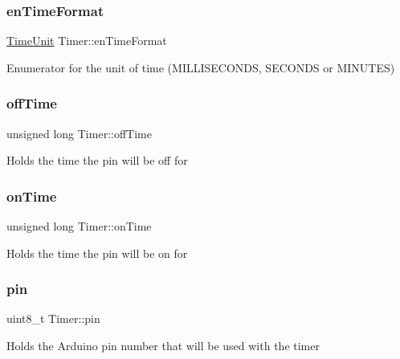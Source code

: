 \subsubsection{\texorpdfstring{en\+Time\+Format}{enTimeFormat}}
{\footnotesize\ttfamily \hyperlink{_timer_8h_add9fe45e09605eee3e4a39c8a5c4476d}{Time\+Unit} Timer\+::en\+Time\+Format\hspace{0.3cm}{\ttfamily [protected]}}

Enumerator for the unit of time (M\+I\+L\+L\+I\+S\+E\+C\+O\+N\+DS, S\+E\+C\+O\+N\+DS or M\+I\+N\+U\+T\+ES) \hypertarget{class_timer_a884fa0db2b95029da69e11fbb53612b2}{}\label{class_timer_a884fa0db2b95029da69e11fbb53612b2} 
\subsubsection{\texorpdfstring{off\+Time}{offTime}}
{\footnotesize\ttfamily unsigned long Timer\+::off\+Time\hspace{0.3cm}{\ttfamily [protected]}}

Holds the time the pin will be off for \hypertarget{class_timer_afa967387e3e6c7506334fcd886ea152a}{}\label{class_timer_afa967387e3e6c7506334fcd886ea152a} 
\subsubsection{\texorpdfstring{on\+Time}{onTime}}
{\footnotesize\ttfamily unsigned long Timer\+::on\+Time\hspace{0.3cm}{\ttfamily [protected]}}

Holds the time the pin will be on for \hypertarget{class_timer_a1452d92813046e6badb287f30789580e}{}\label{class_timer_a1452d92813046e6badb287f30789580e} 
\subsubsection{\texorpdfstring{pin}{pin}}
{\footnotesize\ttfamily uint8\+\_\+t Timer\+::pin\hspace{0.3cm}{\ttfamily [protected]}}

Holds the Arduino pin number that will be used with the timer \hypertarget{class_timer_a436bf19bc3bd3dc1c07751adbc1dbe42}{}\label{class_timer_a436bf19bc3bd3dc1c07751adbc1dbe42} 
